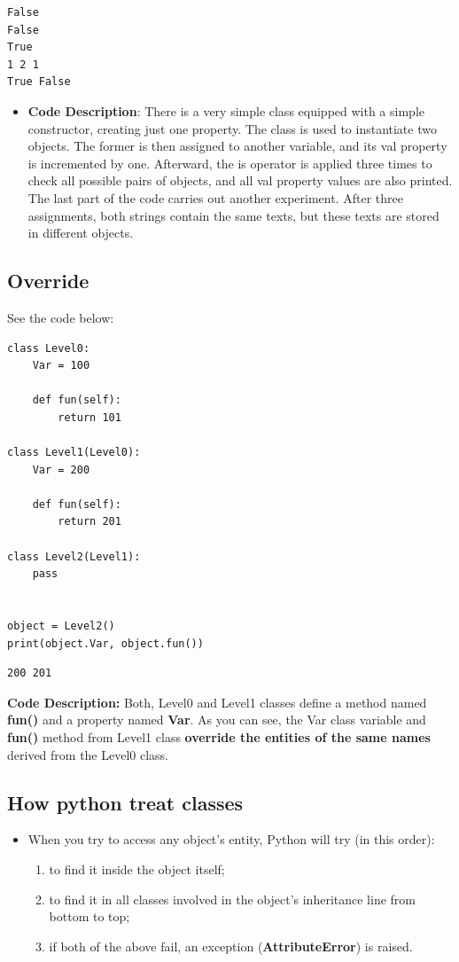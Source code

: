 \documentclass[11pt]{article}
\begin{document}
\begin{verbatim}
False
False
True
1 2 1
True False
\end{verbatim}

\begin{itemize}
\item \textbf{Code Description}: There is a very simple class equipped with a
simple constructor, creating just one property. The class is used to
instantiate two objects. The former is then assigned to another
variable, and its val property is incremented by one.  Afterward,
the is operator is applied three times to check all possible pairs
of objects, and all val property values are also printed. The last
part of the code carries out another experiment. After three
assignments, both strings contain the same texts, but these texts
are stored in different objects.
\end{itemize}
\subsection{Override}
\label{sec:org77bae8d}

See the code below:

\begin{verbatim}
class Level0:
	Var = 100

	def fun(self):
		return 101

class Level1(Level0):
	Var = 200

	def fun(self):
		return 201

class Level2(Level1):
	pass


object = Level2()
print(object.Var, object.fun())

\end{verbatim}

\begin{verbatim}
200 201
\end{verbatim}

\textbf{Code Description:} Both, Level0 and Level1 classes define a method
 named \textbf{fun()} and a property named \textbf{Var}. As you can see, the Var
 class variable and \textbf{fun()} method from Level1 class \textbf{override the
 entities of the same names} derived from the Level0 class.

\subsection{How python treat classes}
\label{sec:org6f2ca55}
\begin{itemize}
\item When you try to access any object’s entity, Python will try (in this
order):

\begin{enumerate}
\item to find it inside the object itself;
\item to find it in all classes involved in the object’s inheritance
line from bottom to top;
\item if both of the above fail, an exception (\textbf{AttributeError}) is
raised.
\end{enumerate}
\end{itemize}
\end{document}
